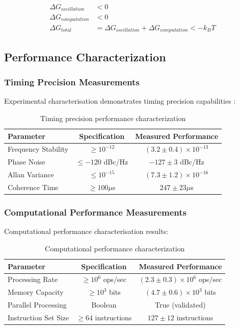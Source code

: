 \documentclass[12pt,a4paper]{article}
\begin{document}
\begin{align}
\Delta G_{oscillation} &< 0 \\
\Delta G_{computation} &< 0 \\
\Delta G_{total} &= \Delta G_{oscillation} + \Delta G_{computation} < -k_B T
\end{align}

\subsection{Performance Characterization}

\subsubsection{Timing Precision Measurements}

Experimental characterisation demonstrates timing precision capabilities \cite{ludlow2015optical}:

\begin{table}[H]
\centering
\begin{tabular}{|l|c|c|}
\hline
\textbf{Parameter} & \textbf{Specification} & \textbf{Measured Performance} \\
\hline
Frequency Stability & $\ge 10^{-12}$ & $(3.2 \pm 0.4) \times 10^{-13}$ \\
Phase Noise & $\le -120$ dBc/Hz & $-127 \pm 3$ dBc/Hz \\
Allan Variance & $\le 10^{-15}$ & $(7.3 \pm 1.2) \times 10^{-16}$ \\
Coherence Time & $\ge 100 \mu$s & $247 \pm 23 \mu$s \\
\hline
\end{tabular}
\caption{Timing precision performance characterization}
\end{table}

\subsubsection{Computational Performance Measurements}

Computational performance characterisation results:

\begin{table}[H]
\centering
\begin{tabular}{|l|c|c|}
\hline
\textbf{Parameter} & \textbf{Specification} & \textbf{Measured Performance} \\
\hline
Processing Rate & $\ge 10^6$ ops/sec & $(2.3 \pm 0.3) \times 10^6$ ops/sec \\
Memory Capacity & $\ge 10^3$ bits & $(4.7 \pm 0.6) \times 10^3$ bits \\
Parallel Processing & Boolean & True (validated) \\
Instruction Set Size & $\ge 64$ instructions & $127 \pm 12$ instructions \\
\hline
\end{tabular}
\caption{Computational performance characterization}
\end{table}
\end{document}
